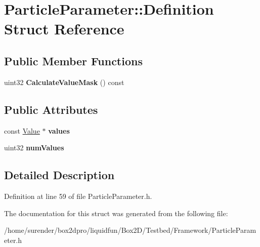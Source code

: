 \hypertarget{structParticleParameter_1_1Definition}{\section{Particle\-Parameter\-:\-:Definition Struct Reference}
\label{structParticleParameter_1_1Definition}
}
\subsection*{Public Member Functions}
\begin{DoxyCompactItemize}
\item 
\hypertarget{structParticleParameter_1_1Definition_ad1bf8ccdb19046a18473da91fbd8154c}{uint32 {\bfseries Calculate\-Value\-Mask} () const }\label{structParticleParameter_1_1Definition_ad1bf8ccdb19046a18473da91fbd8154c}

\end{DoxyCompactItemize}
\subsection*{Public Attributes}
\begin{DoxyCompactItemize}
\item 
\hypertarget{structParticleParameter_1_1Definition_ac082103492ef83d6393b64249e5a51f4}{const \hyperlink{structParticleParameter_1_1Value}{Value} $\ast$ {\bfseries values}}\label{structParticleParameter_1_1Definition_ac082103492ef83d6393b64249e5a51f4}

\item 
\hypertarget{structParticleParameter_1_1Definition_ad2fe39786c3cc53652fdd9f44d3142b1}{uint32 {\bfseries num\-Values}}\label{structParticleParameter_1_1Definition_ad2fe39786c3cc53652fdd9f44d3142b1}

\end{DoxyCompactItemize}


\subsection{Detailed Description}


Definition at line 59 of file Particle\-Parameter.\-h.



The documentation for this struct was generated from the following file\-:\begin{DoxyCompactItemize}
\item 
/home/surender/box2dpro/liquidfun/\-Box2\-D/\-Testbed/\-Framework/Particle\-Parameter.\-h\end{DoxyCompactItemize}
